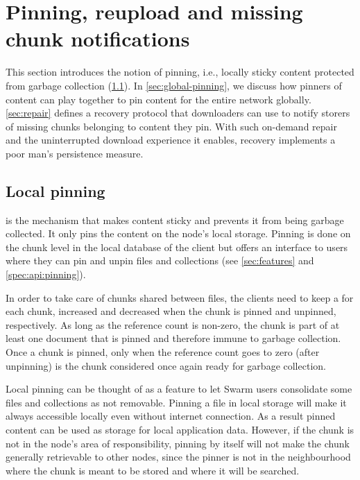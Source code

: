 \section{Pinning, reupload and missing chunk notifications \statusyellow}\label{sec:reupload}

This section introduces the notion of pinning, i.e., locally sticky content protected from garbage collection (\ref{sec:pinning}). In \ref{sec:global-pinning}, we discuss how pinners of content can play together to pin content for  the entire network globally. \ref{sec:repair}   defines a recovery protocol that downloaders can use to notify storers of missing chunks belonging to content they pin. With such on-demand repair and the uninterrupted download experience it enables, recovery implements a poor man's persistence measure.

\subsection{Local pinning \statusgreen}\label{sec:pinning}

 is the mechanism that makes content sticky and prevents it from being garbage collected. It only pins the content on the node's local storage. Pinning is done on the chunk level in the local database of the client but offers an interface to users where they can pin and unpin files and collections (see \ref{sec:features} and \ref{spec:api:pinning}). 

In order to take care of chunks shared between files, the clients need to keep a  for each chunk, increased and decreased when the chunk is pinned and unpinned, respectively. As long as the reference count is non-zero, the chunk is part of at least one document that is pinned and therefore immune to garbage collection. Once a chunk is pinned, only when the reference count goes to zero (after unpinning) is the chunk considered once again ready for garbage collection.

Local pinning can be thought of as a feature to let Swarm users consolidate some files and collections as not removable. Pinning a file in local storage will make it always accessible locally even without internet connection. As a result pinned content can be used as storage for local application data. However, if the chunk is not in the node's area of responsibility, pinning by itself will not make the chunk generally retrievable to other nodes, since the pinner is not in the neighbourhood where the chunk is meant to be stored and where it will be searched.


